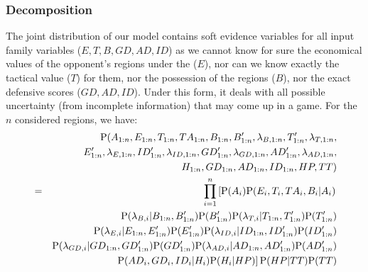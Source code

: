 \subsubsection{Decomposition}
The joint distribution of our model contains soft evidence variables for all input family variables ($E,T,B,GD,AD,ID$) as we cannot know for sure the economical values of the opponent's regions under the  ($E$), nor can we know exactly the tactical value ($T$) for them, nor the possession of the regions ($B$), nor the exact defensive scores ($GD,AD,ID$). Under this form, it deals with all possible uncertainty (from incomplete information) that may come up in a game. 
For the $n$ considered regions, we have:
\begin{eqnarray}
    & & \mathrm{P}(A_{1:n}, E_{1:n}, T_{1:n}, TA_{1:n}, B_{1:n}, 
B'_{1:n}, \lambda_{B,1:n}, T'_{1:n}, \lambda_{T,1:n}, \\
& & E'_{1:n}, \lambda_{E,1:n},
ID'_{1:n}, \lambda_{ID,1:n},
GD'_{1:n}, \lambda_{GD,1:n},
AD'_{1:n}, \lambda_{AD,1:n},\\
& & H_{1:n}, GD_{1:n}, AD_{1:n}, ID_{1:n}, HP, TT) \\
    & = & \prod_{i=1}^n \left[\mathrm{P}(A_i)\mathrm{P}(E_i,T_i,TA_i,B_i|A_i) \right.\\
& & \mathrm{P}(\lambda_{B,i} | B_{1:n},B'_{1:n})\mathrm{P}(B'_{1:n}) 
\mathrm{P}(\lambda_{T,i} | T_{1:n},T'_{1:n})\mathrm{P}(T'_{1:n}) \\
& & \mathrm{P}(\lambda_{E,i} | E_{1:n},E'_{1:n})\mathrm{P}(E'_{1:n}) 
\mathrm{P}(\lambda_{ID,i} | ID_{1:n},ID'_{1:n})\mathrm{P}(ID'_{1:n}) \\
& & \mathrm{P}(\lambda_{GD,i} | GD_{1:n},GD'_{1:n})\mathrm{P}(GD'_{1:n})
\mathrm{P}(\lambda_{AD,i} | AD_{1:n},AD'_{1:n})\mathrm{P}(AD'_{1:n}) \\
& & \left. \mathrm{P}(AD_i,GD_i,ID_i|H_i)\mathrm{P}(H_i|HP)\right]\mathrm{P}(HP|TT)\mathrm{P}(TT)
\end{eqnarray}

